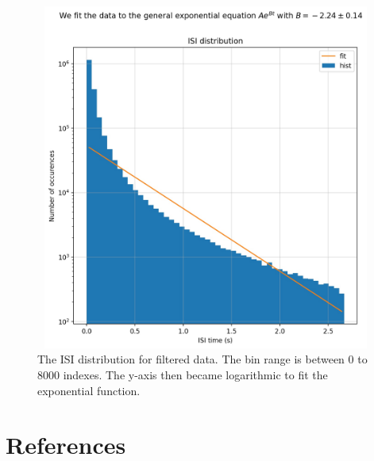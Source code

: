\documentclass[9pt,twocolumn]{paper-template}
\begin{document}
\begin{figure}
\centering
\includegraphics[width=12cm,height=11.4cm]{isi_logfit.jpg}
\caption{The ISI distribution for filtered data. The bin range is between 0 to 8000 indexes. The y-axis then became logarithmic to fit the exponential function.}\label{fig:isi}
\end{figure}

\section*{References}

\end{document}
